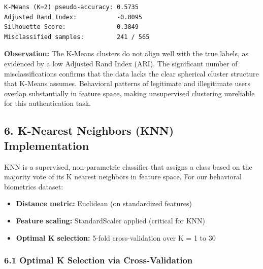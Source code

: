 \documentclass[11pt]{article}
\providecommand{\tightlist}{%
      \setlength{\itemsep}{0pt}\setlength{\parskip}{0pt}}
\begin{document}
    \begin{Verbatim}[commandchars=\\\{\}]
K-Means (K=2) pseudo-accuracy: 0.5735
Adjusted Rand Index:           -0.0095
Silhouette Score:              0.3849
Misclassified samples:         241 / 565
    \end{Verbatim}

    \textbf{Observation:} The K-Means clusters do not align well with the
true labels, as evidenced by a low Adjusted Rand Index (ARI). The
significant number of misclassifications confirms that the data lacks
the clear spherical cluster structure that K-Means assumes. Behavioral
patterns of legitimate and illegitimate users overlap substantially in
feature space, making unsupervised clustering unreliable for this
authentication task.

    \subsection{6. K-Nearest Neighbors (KNN)
Implementation}\label{k-nearest-neighbors-knn-implementation}

KNN is a supervised, non-parametric classifier that assigns a class
based on the majority vote of its K nearest neighbors in feature space.
For our behavioral biometrics dataset:

\begin{itemize}
\tightlist
\item
  \textbf{Distance metric:} Euclidean (on standardized features)
\item
  \textbf{Feature scaling:} StandardScaler applied (critical for KNN)
\item
  \textbf{Optimal K selection:} 5-fold cross-validation over K = 1 to 30
\end{itemize}

    \subsubsection{6.1 Optimal K Selection via
Cross-Validation}\label{optimal-k-selection-via-cross-validation}
\end{document}
